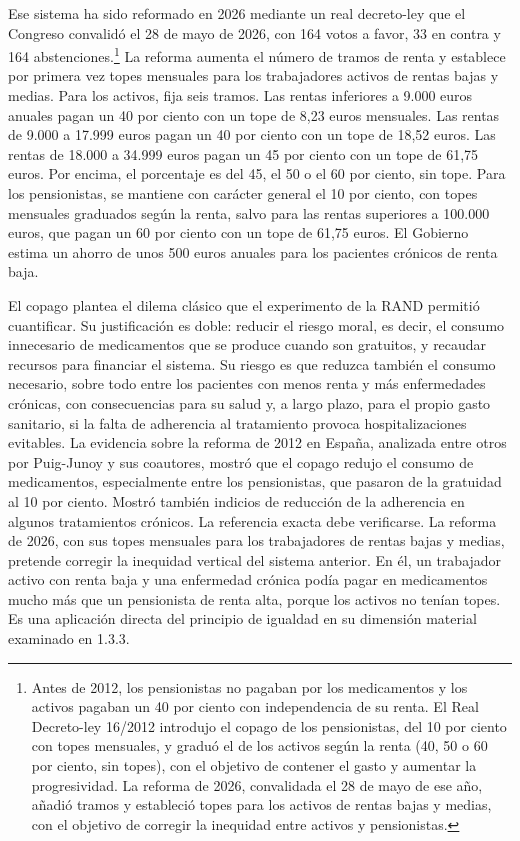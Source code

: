 \documentclass[10pt,a4paper]{article}
\begin{document}
Ese sistema ha sido reformado en 2026 mediante un real decreto-ley que el Congreso convalidó el 28 de mayo de 2026, con 164 votos a favor, 33 en contra y 164 abstenciones.\footnote{Antes de 2012, los pensionistas no pagaban por los medicamentos y los activos pagaban un 40 por ciento con independencia de su renta. El Real Decreto-ley 16/2012 introdujo el copago de los pensionistas, del 10 por ciento con topes mensuales, y graduó el de los activos según la renta (40, 50 o 60 por ciento, sin topes), con el objetivo de contener el gasto y aumentar la progresividad. La reforma de 2026, convalidada el 28 de mayo de ese año, añadió tramos y estableció topes para los activos de rentas bajas y medias, con el objetivo de corregir la inequidad entre activos y pensionistas.
} La reforma aumenta el número de tramos de renta y establece por primera vez topes mensuales para los trabajadores activos de rentas bajas y medias. Para los activos, fija seis tramos. Las rentas inferiores a 9.000 euros anuales pagan un 40 por ciento con un tope de 8,23 euros mensuales. Las rentas de 9.000 a 17.999 euros pagan un 40 por ciento con un tope de 18,52 euros. Las rentas de 18.000 a 34.999 euros pagan un 45 por ciento con un tope de 61,75 euros. Por encima, el porcentaje es del 45, el 50 o el 60 por ciento, sin tope. Para los pensionistas, se mantiene con carácter general el 10 por ciento, con topes mensuales graduados según la renta, salvo para las rentas superiores a 100.000 euros, que pagan un 60 por ciento con un tope de 61,75 euros. El Gobierno estima un ahorro de unos 500 euros anuales para los pacientes crónicos de renta baja.

El copago plantea el dilema clásico que el experimento de la RAND permitió cuantificar. Su justificación es doble: reducir el riesgo moral, es decir, el consumo innecesario de medicamentos que se produce cuando son gratuitos, y recaudar recursos para financiar el sistema. Su riesgo es que reduzca también el consumo necesario, sobre todo entre los pacientes con menos renta y más enfermedades crónicas, con consecuencias para su salud y, a largo plazo, para el propio gasto sanitario, si la falta de adherencia al tratamiento provoca hospitalizaciones evitables. La evidencia sobre la reforma de 2012 en España, analizada entre otros por Puig-Junoy y sus coautores, mostró que el copago redujo el consumo de medicamentos, especialmente entre los pensionistas, que pasaron de la gratuidad al 10 por ciento. Mostró también indicios de reducción de la adherencia en algunos tratamientos crónicos. La referencia exacta debe verificarse. La reforma de 2026, con sus topes mensuales para los trabajadores de rentas bajas y medias, pretende corregir la inequidad vertical del sistema anterior. En él, un trabajador activo con renta baja y una enfermedad crónica podía pagar en medicamentos mucho más que un pensionista de renta alta, porque los activos no tenían topes. Es una aplicación directa del principio de igualdad en su dimensión material examinado en 1.3.3.
\end{document}
